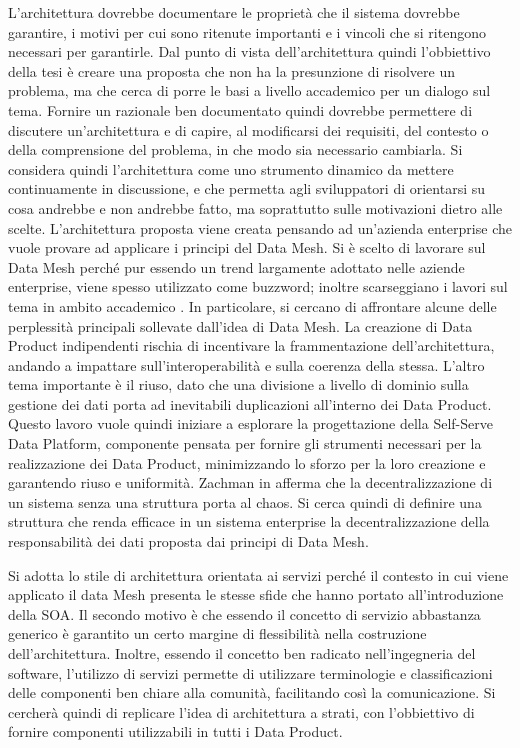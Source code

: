 \documentclass[12pt]{report}
\begin{document}
L'architettura dovrebbe documentare le proprietà che il sistema dovrebbe garantire, i motivi per cui sono ritenute importanti e i vincoli che si ritengono necessari per garantirle.
Dal punto di vista dell'architettura quindi l'obbiettivo della tesi è creare una proposta che non ha la presunzione di risolvere un problema, ma che cerca di porre le basi a livello accademico per un dialogo sul tema. 
Fornire un razionale ben documentato quindi dovrebbe permettere di discutere un'architettura e di capire, al modificarsi dei requisiti, del contesto o della comprensione del problema, in che modo sia necessario cambiarla.
Si considera quindi l'architettura come uno strumento dinamico da mettere continuamente in discussione, e che permetta agli sviluppatori di orientarsi su cosa andrebbe e non andrebbe fatto, ma soprattutto sulle motivazioni dietro alle scelte.
L'architettura proposta viene creata pensando ad un'azienda enterprise che vuole provare ad applicare i principi del Data Mesh.
Si è scelto di lavorare sul Data Mesh perché pur essendo un trend largamente adottato nelle aziende enterprise, viene spesso utilizzato come buzzword; inoltre scarseggiano i lavori sul tema in ambito accademico \cite{goedegebuure2023data}.
In particolare, si cercano di affrontare alcune delle perplessità principali sollevate dall'idea di Data Mesh.
La creazione di Data Product indipendenti rischia di incentivare la frammentazione dell'architettura, andando a impattare sull'interoperabilità e sulla coerenza della stessa.
L'altro tema importante è il riuso, dato che una divisione a livello di dominio sulla gestione dei dati porta ad inevitabili duplicazioni all'interno dei Data Product.
Questo lavoro vuole quindi iniziare a esplorare la progettazione della Self-Serve Data Platform, componente pensata per fornire gli strumenti necessari per la realizzazione dei Data Product, minimizzando lo sforzo per la loro creazione e garantendo riuso e uniformità.
Zachman  in \cite{zachman1987framework} afferma che la decentralizzazione di un sistema senza una struttura porta al chaos. 
Si cerca quindi di definire una struttura che renda efficace in un sistema enterprise la decentralizzazione della responsabilità dei dati proposta dai principi di Data Mesh.

Si adotta lo stile di architettura orientata ai servizi perché il contesto in cui viene applicato il data Mesh presenta le stesse sfide che hanno portato all'introduzione della SOA. 
Il secondo motivo è che essendo il concetto di servizio abbastanza generico è garantito un certo margine di flessibilità nella costruzione dell'architettura.
Inoltre, essendo il concetto ben radicato nell'ingegneria del software, l'utilizzo di servizi permette di utilizzare terminologie e classificazioni delle componenti ben chiare alla comunità, facilitando così la comunicazione.
Si cercherà quindi di replicare l'idea di architettura a strati, con l'obbiettivo di fornire componenti utilizzabili in tutti i Data Product.
\end{document}
